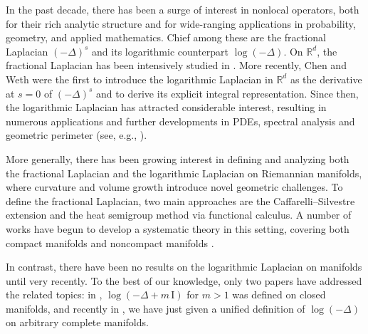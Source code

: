 \documentclass[reqno,12pt]{amsart}
\numberwithin{equation}{section}
\begin{document}
In the past decade, there has been a surge of interest in nonlocal operators, both for their rich analytic structure and for wide-ranging applications in probability, geometry, and applied mathematics. Chief among these are the fractional Laplacian $\left(-\Delta\right)^s$ and its logarithmic counterpart $\log\left(-\Delta\right).$ On \(\mathbb{R}^d\), the fractional Laplacian has been intensively studied in \cite{caffarelli2007extension,di2012hitchhikerʼs,kwasnicki2017ten,chen2012dirichlet,ros2014dirichlet,stinga2010extension,servadei2012mountain,servadei2013variational,kwasnicki2012eigenvalues,feulefack2022small}. More recently, Chen and Weth \cite{chen2019dirichlet} were the first to introduce the logarithmic Laplacian in $\mathbb{R}^d$ as the derivative at \(s=0\) of \((-\Delta)^s\) and to derive its explicit integral representation. Since then, the logarithmic Laplacian has attracted considerable interest, resulting in  numerous applications and further developments in PDEs, spectral analysis and geometric perimeter (see, e.g., \cite{chen2023bounds,laptev2021spectral,chen2024cauchy,jarohs2020new,chen2023extension,zhang2021direct,hernandez2024optimal,de20190}).



More generally, there has been growing interest in defining and analyzing both the fractional Laplacian and the logarithmic Laplacian on Riemannian manifolds, where curvature and volume growth introduce novel geometric challenges. To define the fractional Laplacian, two main approaches are the Caffarelli–Silvestre extension and the heat semigroup method via functional calculus. A number of works have begun to develop a systematic theory in this setting, covering both compact manifolds \cite{d2016fractional,feizmohammadi2024fractional,li2024inverse,de2017fractional} and noncompact manifolds \cite{banica2015some,caselli2023asymptotics,caselli2024fractional,bhowmik2022extension,papageorgiou2024asymptotic,alonso2018integral,papageorgiou2024large,kim2022harnack,anker2024schr}.  


In contrast, there have been no results on the logarithmic Laplacian on manifolds until very recently.  To the best of our knowledge, only two papers have addressed the related topics: in \cite{pramanik2025anisotropic},  \(\log(-\Delta + m\,\mathrm{I})\) for \(m>1\) was defined on closed manifolds, and recently in \cite{chen2025logarithmic}, we have just given a unified definition of \(\log(-\Delta)\) on arbitrary complete manifolds.
\end{document}
